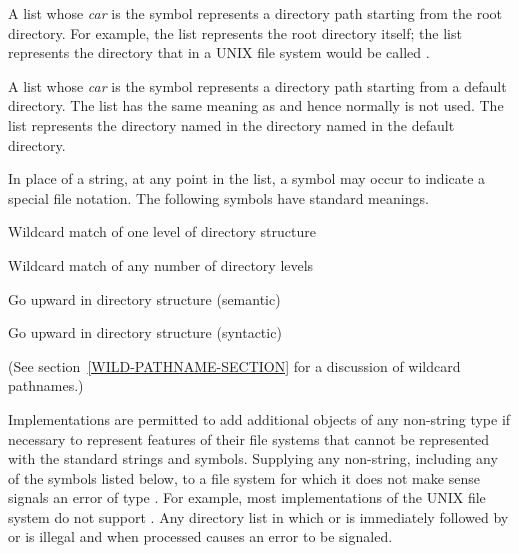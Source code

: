   A list whose \emph{car} is the symbol  represents a directory path
  starting from the root directory.  For example, the list  represents
  the root directory itself;  the list  represents
  the directory that in a UNIX file system would be called .

  A list whose \emph{car} is the symbol  represents a directory path
  starting from a default directory.  The list  has the same
  meaning as  and hence normally is not used.  The list 
  represents the directory named  in the directory named  in the
  default directory.

  In place of a string, at any point in the list, a symbol may occur to
  indicate a special file notation. The following symbols have standard
  meanings.
\begin{indentdesc}{}
\item[\cd{:wild}]
Wildcard match of one level of directory structure

\item[\cd{:wild-inferiors}]
  Wildcard match of any number of directory levels

\item[\cd{:up}]
  Go upward in directory structure (semantic)

\item[\cd{:back}]
  Go upward in directory structure (syntactic)
\end{indentdesc}

  (See section~\ref{WILD-PATHNAME-SECTION} for a discussion of wildcard pathnames.)

  Implementations are permitted to add additional objects of any
  non-string type if necessary to represent features of their file systems
  that cannot be represented with the standard strings and symbols.
  Supplying any non-string, including any of the symbols listed below, to a
  file system for which it does not make sense signals an error of type
  .  For example, most implementations of the UNIX file system
  do not support .  Any directory list in which
   or  is immediately followed by  or 
  is illegal and when  processed causes an error to be signaled.

